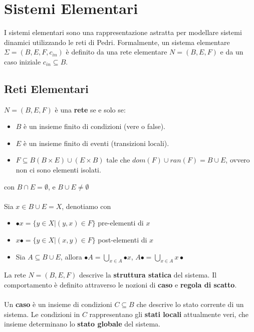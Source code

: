 \section{Sistemi Elementari}

I sistemi elementari sono una rappresentazione astratta per modellare sistemi dinamici utilizzando le reti di Pedri. Formalmente, un sistema elementare $\Sigma = (B, E, F, c_{in})$ è definito da una rete elementare $N = (B, E, F)$ e da un caso iniziale $c_{in} \subseteq B$.

\subsection{Reti Elementari}
$N = (B, E, F)$ è una \textbf{rete} se e solo se:
\begin{itemize}
	\item $B$ è un insieme finito di condizioni (vere o false).

	\item $E$ è un insieme finito di eventi (transizioni locali).
	\item $F \subseteq B (B \times E) \cup (E \times B)$ tale che $dom(F) \cup ran(F) = B \cup E$, ovvero non ci sono elementi isolati.
\end{itemize}
con $B \cap E = \emptyset$, e $B \cup E \neq \emptyset$
\\
\\
Sia $x \in B \cup E = X$, denotiamo con
\begin{itemize}
	\renewcommand\labelitemi{} %
	\item $\bullet x = \{ y \in X | (y, x) \in F \}$ pre-elementi di $x$
	\item $x \bullet = \{ y \in X | (x, y) \in F \}$ post-elementi di $x$
	\item Sia $A \subseteq B \cup E$, allora $\bullet A = \bigcup_{x \in A}{\bullet x}$, $A \bullet = \bigcup_{x \in A}{x \bullet}$
\end{itemize}
\vspace{1em}
\noindent
La rete $N = (B, E, F)$ descrive la \textbf{struttura statica} del sistema. Il comportamento è definito attraverso le nozioni di \textbf{caso} e \textbf{regola di scatto}.
\\
\\
Un \textbf{caso} è un insieme di condizioni \(C \subseteq B\) che descrive lo stato corrente di un sistema. Le condizioni in \(C\) rappresentano gli \textbf{stati locali} attualmente veri, che insieme determinano lo \textbf{stato globale} del sistema.

